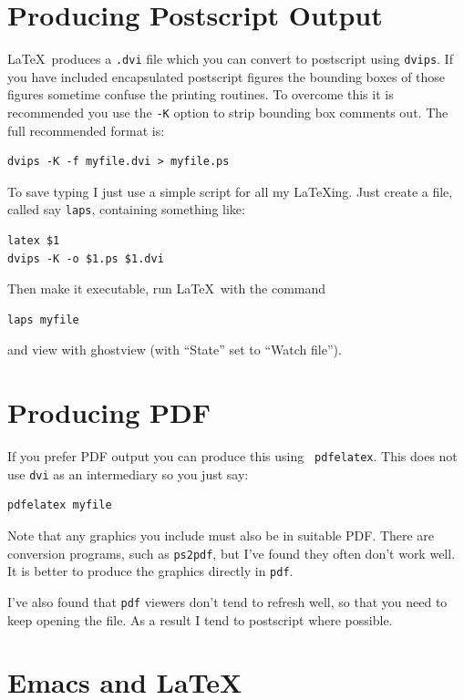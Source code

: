 \documentclass{cshonours}
\begin{document}
\section{Producing Postscript Output}

\LaTeX\ produces a {\tt .dvi} file which you can convert to postscript
using {\tt dvips}. If you have included encapsulated postscript figures the
bounding boxes of those figures sometime confuse the printing
routines. To overcome this it is recommended you use the {\tt -K}
option to strip bounding box comments out. The full recommended format
is:

\begin{verbatim}
dvips -K -f myfile.dvi > myfile.ps
\end{verbatim}

To save typing I just use a simple script for
all my {\LaTeX}ing. Just create a file, called say {\tt laps}, containing something like:
\begin{verbatim}
latex $1
dvips -K -o $1.ps $1.dvi
\end{verbatim}
Then make it executable, run \LaTeX\ with the command
\begin{verbatim}
laps myfile
\end{verbatim}
and view with ghostview (with ``State'' set to ``Watch file'').

\section{Producing PDF}

If you prefer PDF output you can produce this using {\tt
pdfelatex}. This does not use {\tt dvi} as an intermediary so you just
say:
\begin{verbatim}
pdfelatex myfile
\end{verbatim}

Note that any graphics you include must also be in
suitable PDF. There are conversion programs, such as {\tt ps2pdf}, but
I've found they often don't work well. It is better to produce the
graphics directly in {\tt pdf}.

I've also found that {\tt pdf} viewers don't tend to refresh well, so
that you need to keep opening the file. As a result I tend to
postscript where possible.


\section{Emacs and \LaTeX}
\end{document}
